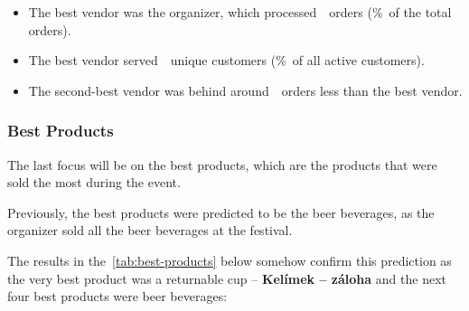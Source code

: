 \begin{keytakeaways}
	\begin{itemize}
		\item The best vendor was the organizer, which processed~~orders (\%~of the total orders).
		\item The best vendor served~~unique customers (\%~of all active customers).
		\item The second-best vendor was behind around~~orders less than the best vendor.
	\end{itemize}
\end{keytakeaways}


\subsubsection{Best Products}
\label{subsubsec:analysis-best-products}

The last focus will be on the best products, which are the products that were sold the most during the event.

\begin{rqbox}
	\textit{}
\end{rqbox}

Previously, the best products were predicted to be the beer beverages, as the organizer sold all the beer beverages at the festival.

The results in the~\autoref{tab:best-products} below somehow confirm this prediction as the very best product was a returnable cup – \textbf{Kelímek – záloha} and the next four best products were beer beverages:


